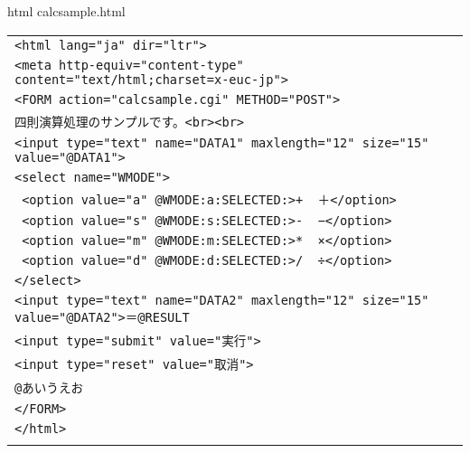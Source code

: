 {\gt html} calcsample.html

{\footnotesize 
\begin{tabular}{|l|}
\hline
\vspace{-0.4em}\verb!<html lang="ja" dir="ltr">!\\
\vspace{-0.4em}\verb!<meta http-equiv="content-type" content="text/html;charset=x-euc-jp">!\\
\vspace{-0.4em}\verb!<FORM action="calcsample.cgi" METHOD="POST">!\\
\vspace{-0.4em}\verb!四則演算処理のサンプルです。<br><br>!\\
\vspace{-0.4em}\verb!<input type="text" name="DATA1" maxlength="12" size="15" value="@DATA1">!\\
\vspace{-0.4em}\verb!<select name="WMODE">!\\
\vspace{-0.4em}\verb! <option value="a" @WMODE:a:SELECTED:>+  ＋</option>!\\
\vspace{-0.4em}\verb! <option value="s" @WMODE:s:SELECTED:>-  −</option>!\\
\vspace{-0.4em}\verb! <option value="m" @WMODE:m:SELECTED:>*  ×</option>!\\
\vspace{-0.4em}\verb! <option value="d" @WMODE:d:SELECTED:>/  ÷</option>!\\
\vspace{-0.4em}\verb!</select>!\\
\vspace{-0.4em}\verb!<input type="text" name="DATA2" maxlength="12" size="15" value="@DATA2">＝@RESULT!\\
\vspace{-0.4em}\verb!<input type="submit" value="実行">!\\
\vspace{-0.4em}\verb!<input type="reset" value="取消">!\\
\vspace{-0.4em}\verb!@あいうえお!\\
\vspace{-0.4em}\verb!</FORM>!\\
\vspace{-0.4em}\verb!</html>!\\
\\
\hline
\end{tabular}
}

